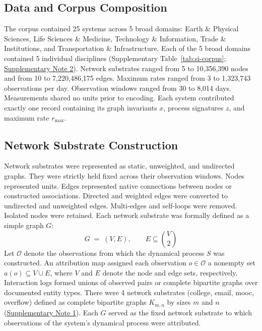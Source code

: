 \documentclass{article}
\begin{document}
\subsection*{Data and Corpus Composition}
The corpus contained 25 systems across 5 broad domains: Earth \& Physical Sciences, Life Sciences \& Medicine, Technology \& Information, Trade \& Institutions, and Transportation \& Infrastructure. Each of the 5 broad domains contained 5 individual disciplines (Supplementary Table~\ref{tab:si-corpus}; \hyperref[sec:si-note-processing]{Supplementary Note 2}). Network substrates ranged from 5 to 10,356,390 nodes and from 10 to 7,220,486,175 edges. Maximum rates ranged from 3 to 1,323,743 observations per day. Observation windows ranged from 30 to 8,014 days. Measurements shared no units prior to encoding. Each system contributed exactly one record containing its graph invariants $x$, process signatures $z$, and maximum rate $r_{\max}$.

\subsection*{Network Substrate Construction}
Network substrates were represented as static, unweighted, and undirected graphs. They were strictly held fixed across their observation windows. Nodes represented units. Edges represented native connections between nodes or constructed associations. Directed and weighted edges were converted to undirected and unweighted edges. Multi-edges and self-loops were removed. Isolated nodes were retained. Each network substrate was formally defined as a simple graph $G$:
\begin{equation}
    G \;=\; (V, E),
    \qquad
    E \subseteq \binom{V}{2}
\label{eq:graph}
\end{equation}
Let $\mathcal{O}$ denote the observations from which the dynamical process $S$ was constructed. An attribution map assigned each observation $o \in \mathcal{O}$ a nonempty set $a(o) \subseteq V \cup E$, where $V$ and $E$ denote the node and edge sets, respectively. Interaction logs formed unions of observed pairs or complete bipartite graphs over documented entity types. There were 4 network substrates (college, email, mooc, overflow) defined as complete bipartite graphs $K_{m,n}$ by sizes $m$ and $n$ (\hyperref[sec:si-note-bipartite]{Supplementary Note 1}). Each $G$ served as the fixed network substrate to which observations of the system's dynamical process were attributed.
\end{document}
